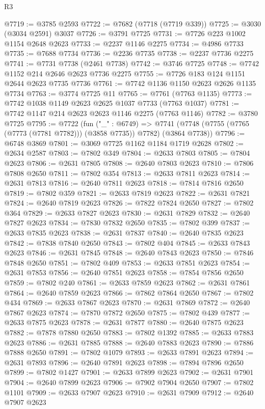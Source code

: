 \begin{lexlean}{R3}
\begin{coremodule}
@7719 := @3785 @2593
@7722 := @7682 (@7718 (@7719 @339))
@7725 := @3030 (@3034 @2591) @3037
@7726 := @3791 @7725
@7731 := @7726 @223 @1002 @1154 @2648 @2623
@7733 := @2237 @1146 @2275
@7734 := @4986 @7733
@7735 := @7688 @7734
@7736 := @2236 @7735
@7738 := @2237 @7736 @2275
@7741 := @7731 @7738 (@2461 @7738)
@7742 := @3746 @7725
@7748 := @7742 @1152 @214 @2646 @2623 @7736 @2275
@7755 := @7726 @183 @124 @1151 @2644 @2623 @7735 @7736
@7761 := @7742 @1136 @1150 @2623 @2626 @1135 @7734
@7763 := @3774 @7725 @11
@7765 := @7761 (@7763 @1135)
@7773 := @7742 @1038 @1149 @2623 @2625 @1037 @7733 (@7763 @1037)
@7781 := @7742 @1147 @214 @2623 @2623 @1146 @2275 (@7763 @1146)
@7782 := @3780 @7725
@7795 := @7722
    (fun ("_" : @6749) =>
    @7741 (@7748 (@7755 (@7765 (@7773 (@7781 @7782))) (@3858 @7735)) @7782) (@3864 @7738))
@7796 := @6748 @3869
@7801 := @3069 @7725 @1162 @1184 @1719 @2628
@7802 := @2634 @2587
@7803 := @7802 @349
@7804 := @2633 @7803
@7805 := @7804 @2623
@7806 := @2631 @7805
@7808 := @2640 @7803 @2623
@7810 := @7806 @7808 @2650
@7811 := @7802 @354
@7813 := @2633 @7811 @2623
@7814 := @2631 @7813
@7816 := @2640 @7811 @2623
@7818 := @7814 @7816 @2650
@7819 := @7802 @359
@7821 := @2633 @7819 @2623
@7822 := @2631 @7821
@7824 := @2640 @7819 @2623
@7826 := @7822 @7824 @2650
@7827 := @7802 @364
@7829 := @2633 @7827 @2623
@7830 := @2631 @7829
@7832 := @2640 @7827 @2623
@7834 := @7830 @7832 @2650
@7835 := @7802 @399
@7837 := @2633 @7835 @2623
@7838 := @2631 @7837
@7840 := @2640 @7835 @2623
@7842 := @7838 @7840 @2650
@7843 := @7802 @404
@7845 := @2633 @7843 @2623
@7846 := @2631 @7845
@7848 := @2640 @7843 @2623
@7850 := @7846 @7848 @2650
@7851 := @7802 @409
@7853 := @2633 @7851 @2623
@7854 := @2631 @7853
@7856 := @2640 @7851 @2623
@7858 := @7854 @7856 @2650
@7859 := @7802 @240
@7861 := @2633 @7859 @2623
@7862 := @2631 @7861
@7864 := @2640 @7859 @2623
@7866 := @7862 @7864 @2650
@7867 := @7802 @434
@7869 := @2633 @7867 @2623
@7870 := @2631 @7869
@7872 := @2640 @7867 @2623
@7874 := @7870 @7872 @2650
@7875 := @7802 @439
@7877 := @2633 @7875 @2623
@7878 := @2631 @7877
@7880 := @2640 @7875 @2623
@7882 := @7878 @7880 @2650
@7883 := @7802 @1392
@7885 := @2633 @7883 @2623
@7886 := @2631 @7885
@7888 := @2640 @7883 @2623
@7890 := @7886 @7888 @2650
@7891 := @7802 @1079
@7893 := @2633 @7891 @2623
@7894 := @2631 @7893
@7896 := @2640 @7891 @2623
@7898 := @7894 @7896 @2650
@7899 := @7802 @1427
@7901 := @2633 @7899 @2623
@7902 := @2631 @7901
@7904 := @2640 @7899 @2623
@7906 := @7902 @7904 @2650
@7907 := @7802 @1101
@7909 := @2633 @7907 @2623
@7910 := @2631 @7909
@7912 := @2640 @7907 @2623

\end{coremodule}
\end{lexlean}
